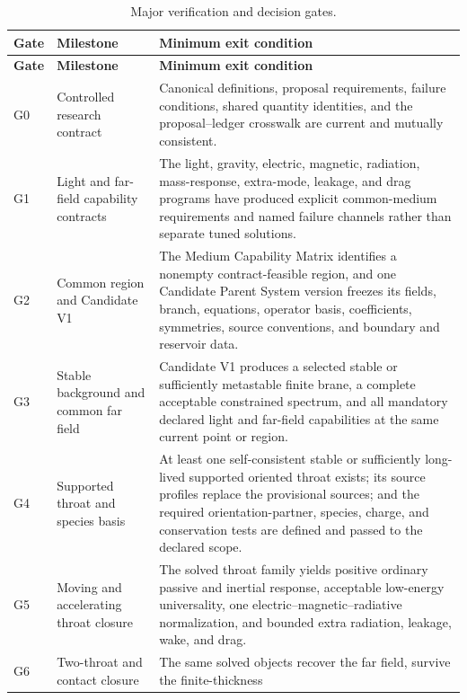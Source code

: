 \begingroup
\small
\begin{longtable}{@{}L{0.08\textwidth}L{0.27\textwidth}L{0.57\textwidth}@{}}
\caption{Major verification and decision gates.}
\label{tab:program-gates}\\
\toprule
\textbf{Gate} & \textbf{Milestone} & \textbf{Minimum exit condition} \\
\midrule
\endfirsthead
\toprule
\textbf{Gate} & \textbf{Milestone} & \textbf{Minimum exit condition} \\
\midrule
\endhead
G0
& Controlled research contract
& Canonical definitions, proposal requirements, failure conditions, shared
  quantity identities, and the proposal--ledger crosswalk are current and
  mutually consistent. \\
\addlinespace
G1
& Light and far-field capability contracts
& The light, gravity, electric, magnetic, radiation, mass-response, extra-mode,
  leakage, and drag programs have produced explicit common-medium requirements
  and named failure channels rather than separate tuned solutions. \\
\addlinespace
G2
& Common region and Candidate V1
& The Medium Capability Matrix identifies a nonempty contract-feasible region,
  and one Candidate Parent System version freezes its fields, branch, equations,
  operator basis, coefficients, symmetries, source conventions, and boundary and
  reservoir data. \\
\addlinespace
G3
& Stable background and common far field
& Candidate V1 produces a selected stable or sufficiently metastable finite
  brane, a complete acceptable constrained spectrum, and all mandatory declared
  light and far-field capabilities at the same current point or region. \\
\addlinespace
G4
& Supported throat and species basis
& At least one self-consistent stable or sufficiently long-lived supported
  oriented throat exists; its source profiles replace the provisional sources;
  and the required orientation-partner, species, charge, and conservation tests
  are defined and passed to the declared scope. \\
\addlinespace
G5
& Moving and accelerating throat closure
& The solved throat family yields positive ordinary passive and inertial
  response, acceptable low-energy universality, one electric--magnetic--radiative
  normalization, and bounded extra radiation, leakage, wake, and drag. \\
\addlinespace
G6
& Two-throat and contact closure
& The same solved objects recover the far field, survive the finite-thickness

\end{longtable}
